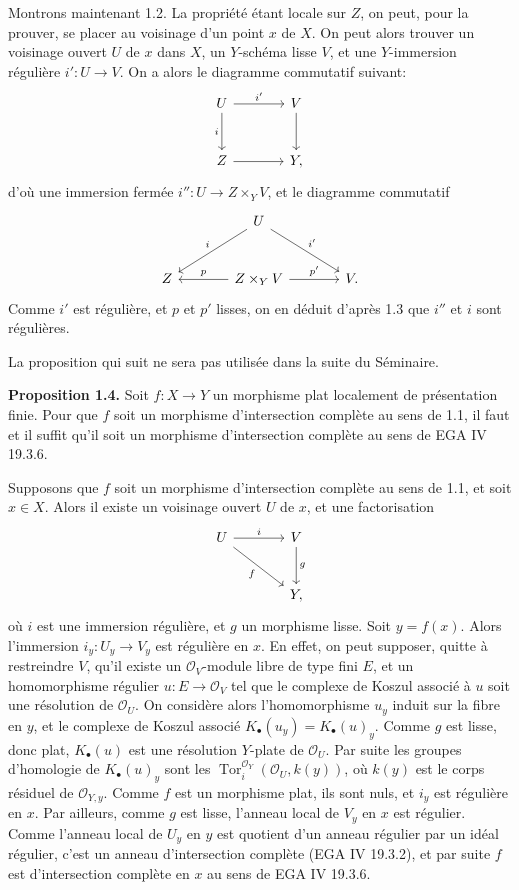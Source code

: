 \documentclass[11pt]{article}
\newcommand{\Tor}{\operatorname{Tor}}
\providecommand{\Tor}{\operatorname{Tor}}
\begin{document}
Montrons maintenant 1.2. La propriété étant locale sur $Z$, on peut, pour la prouver, se placer au voisinage d'un point $x$ de $X$. On peut alors trouver un voisinage ouvert $U$ de $x$ dans $X$, un $Y$-schéma lisse $V$, et une $Y$-immersion régulière $i':U\to V$. On a alors le diagramme commutatif suivant:
\[
\begin{tikzcd}[column sep=large,row sep=large]
U \arrow[r,"i'"] \arrow[d,"i"'] & V \arrow[d]\\
Z \arrow[r] & Y,
\end{tikzcd}
\]
d'où une immersion fermée $i'':U\to Z\times_Y V$, et le diagramme commutatif
\[
\begin{tikzcd}[column sep=large,row sep=large]
& U \arrow[dl,"i"'] \arrow[dr,"i'"] &\\
Z & Z\times_Y V \arrow[l,"p"'] \arrow[r,"p'"] & V.
\end{tikzcd}
\]
Comme $i'$ est régulière, et $p$ et $p'$ lisses, on en déduit d'après 1.3 que $i''$ et $i$ sont régulières.

La proposition qui suit ne sera pas utilisée dans la suite du Séminaire.

\textbf{Proposition 1.4.} Soit $f:X\to Y$ un morphisme plat localement de présentation finie. Pour que $f$ soit un morphisme d'intersection complète au sens de 1.1, il faut et il suffit qu'il soit un morphisme d'intersection complète au sens de EGA IV 19.3.6.

Supposons que $f$ soit un morphisme d'intersection complète au sens de 1.1, et soit $x\in X$. Alors il existe un voisinage ouvert $U$ de $x$, et une factorisation
\[
\begin{tikzcd}[column sep=large,row sep=large]
U \arrow[r,"i"] \arrow[dr,"f"'] & V \arrow[d,"g"]\\
& Y,
\end{tikzcd}
\]
où $i$ est une immersion régulière, et $g$ un morphisme lisse. Soit $y=f(x)$. Alors l'immersion $i_y:U_y\to V_y$ est régulière en $x$. En effet, on peut supposer, quitte à restreindre $V$, qu'il existe un $\mathcal O_V$-module libre de type fini $E$, et un homomorphisme régulier $u:E\to\mathcal O_V$ tel que le complexe de Koszul associé à $u$ soit une résolution de $\mathcal O_U$. On considère alors l'homomorphisme $u_y$ induit sur la fibre en $y$, et le complexe de Koszul associé $K_\bullet(u_y)=K_\bullet(u)_y$. Comme $g$ est lisse, donc plat, $K_\bullet(u)$ est une résolution $Y$-plate de $\mathcal O_U$. Par suite les groupes d'homologie de $K_\bullet(u)_y$ sont les $\Tor_i^{\mathcal O_Y}(\mathcal O_U,k(y))$, où $k(y)$ est le corps résiduel de $\mathcal O_{Y,y}$. Comme $f$ est un morphisme plat, ils sont nuls, et $i_y$ est régulière en $x$. Par ailleurs, comme $g$ est lisse, l'anneau local de $V_y$ en $x$ est régulier. Comme l'anneau local de $U_y$ en $y$ est quotient d'un anneau régulier par un idéal régulier, c'est un anneau d'intersection complète (EGA IV 19.3.2), et par suite $f$ est d'intersection complète en $x$ au sens de EGA IV 19.3.6.
\end{document}
